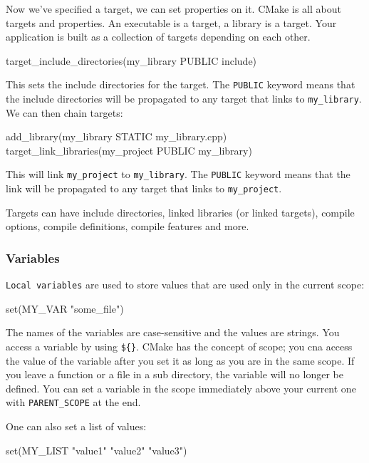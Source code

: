 Now we've specified a target, we can set properties on it.
CMake is all about targets and properties. An executable is a target, a library is a target. Your
application is built as a collection of targets depending on each other.


\begin{codeblock}[language=C++]
target_include_directories(my_library PUBLIC include)
\end{codeblock}

This sets the include directories for the target. The \texttt{PUBLIC} keyword means that the include directories will be propagated to any target that links to \texttt{my\_library}.
We can then chain targets:

\begin{codeblock}[language=C++]
add_library(my_library STATIC my_library.cpp)
target_link_libraries(my_project PUBLIC my_library)
\end{codeblock}

This will link \texttt{my\_project} to \texttt{my\_library}. The \texttt{PUBLIC} keyword means that the link will be propagated to any target that links to \texttt{my\_project}.

Targets can have include directories, linked libraries (or linked targets), compile options, compile definitions, 
compile features and more.

\subsubsection{Variables}

\texttt{Local variables} are used to store values that are used only in the current scope:

\begin{codeblock}[language=C++]
set(MY_VAR "some_file") 
\end{codeblock}

The names of the variables are case-sensitive and the values are strings. You access a variable by using \texttt{\$\{\}}.
CMake has the concept of scope; you cna access the value of the variable after you set it as long as you are in the same scope. If you leave a function or a file in a sub directory, the variable will 
no longer be defined. You can set a variable in the scope immediately above your current one with \texttt{PARENT\_SCOPE} at the end. 

One can also set a list of values:

\begin{codeblock}[language=C++]
set(MY_LIST "value1" "value2" "value3")
\end{codeblock}


